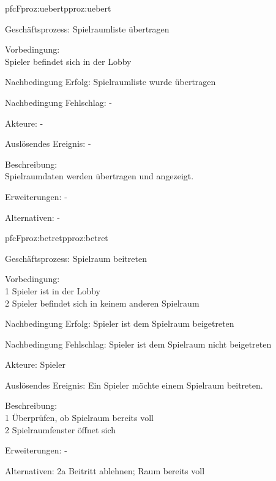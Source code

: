 \begin{description}[leftmargin=3em, style=sameline]
	\begin{php}{pfc}{F}{proz:uebert}{pproz:uebert}
		\item [Geschäftsprozess:] Spielraumliste übertragen
		\item [Vorbedingung:]\hfill\\
		Spieler befindet sich in der Lobby
		\item [Nachbedingung Erfolg:] Spielraumliste wurde übertragen
		\item [Nachbedingung Fehlschlag:] -
		\item [Akteure:] -
		\item [Auslösendes Ereignis:] -
		\item [Beschreibung:] \hfill\\
		Spielraumdaten werden übertragen und angezeigt.
		\item [Erweiterungen:] -
		\item [Alternativen:] -
	\end{php}
	
	\begin{php}{pfc}{F}{proz:betret}{pproz:betret}
		\item [Geschäftsprozess:] Spielraum beitreten
		\item [Vorbedingung:]\hfill\\
		1 Spieler ist in der Lobby \\
		2 Spieler befindet sich in keinem anderen Spielraum
		\item [Nachbedingung Erfolg:] Spieler ist dem Spielraum beigetreten
		\item [Nachbedingung Fehlschlag:] Spieler ist dem Spielraum nicht beigetreten
		\item [Akteure:] Spieler
		\item [Auslösendes Ereignis:] Ein Spieler möchte einem Spielraum beitreten.
		\item [Beschreibung:]\hfill\\
		1 Überprüfen, ob Spielraum bereits voll \\
		2 Spielraumfenster öffnet sich
		\item [Erweiterungen:] -
		\item [Alternativen:] 2a Beitritt ablehnen; Raum bereits voll
	\end{php}
	

\end{description}
